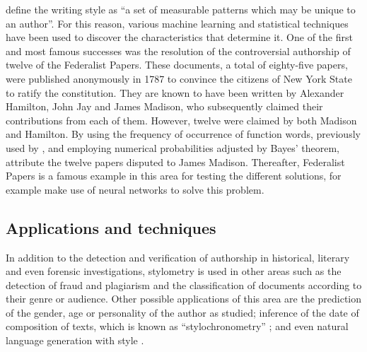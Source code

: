 \cite{neuronalstylometry} define the writing style as ``a set of measurable patterns which may be unique to an author''. For this reason, various machine learning and statistical techniques have been used to discover the characteristics that determine it. One of the first and most famous successes was the resolution of the controversial authorship of twelve of the Federalist Papers. These documents, a total of eighty-five papers, were published anonymously in 1787 to convince the citizens of New York State to ratify the constitution. They are known to have been written by Alexander Hamilton, John Jay and James Madison, who subsequently claimed their contributions from each of them. However, twelve were claimed by both Madison and Hamilton. By using the frequency of occurrence of function words, previously used by \cite{juniusletters}, and employing numerical probabilities adjusted by Bayes' theorem, \cite{federalistpapers} attribute the twelve papers disputed to James Madison. Thereafter, Federalist Papers is a famous example in this area for testing the different solutions, for example \cite{neuronalstylometry} make use of neural networks to solve this problem.

\subsection{Applications and techniques}\label{ssect:techstylo}
In addition to the detection and verification of authorship in historical, literary and even forensic investigations, stylometry is used in other areas such as the detection of fraud and plagiarism and the classification of documents according to their genre or audience. Other possible applications of this area are the prediction of the gender, age or personality of the author as \cite{schwartz2013personality} studied; inference of the date of composition of texts, which is known as ``stylochronometry'' \citep{stamou2007stylochronometry, juola2007becoming}; and even natural language generation with style \citep[Section 5.1]{nlgsoa}.

